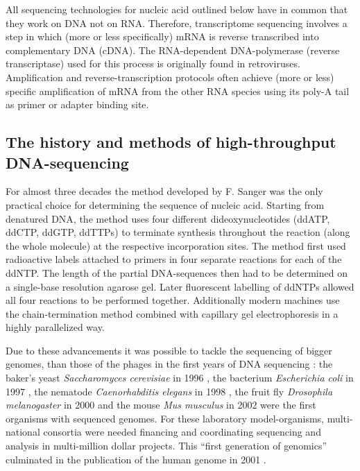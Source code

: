 All sequencing technologies for nucleic acid outlined below have in
common that they work on DNA not on RNA. Therefore, transcriptome
sequencing involves a step in which (more or less specifically) mRNA
is reverse transcribed into complementary DNA (cDNA). The
RNA-dependent DNA-polymerase (reverse transcriptase) used for this
process is originally found in retroviruses. Amplification and
reverse-transcription protocols often achieve (more or less) specific
amplification of mRNA from the other RNA species using its poly-A tail
as primer or adapter binding site.

\subsection{The history and methods of high-throughput DNA-sequencing}
\label{his-seq}

For almost three decades the method developed by F. Sanger
\cite{pmid271968} was the only practical choice for determining the
sequence of nucleic acid. Starting from denatured DNA, the method uses
four different dideoxynucleotides (ddATP, ddCTP, ddGTP, ddTTPs) to
terminate synthesis throughout the reaction (along the whole molecule)
at the respective incorporation sites. The method first used
radioactive labels attached to primers in four separate reactions for
each of the ddNTP. The length of the partial DNA-sequences then had to
be determined on a single-base resolution agarose gel. Later
fluorescent labelling of ddNTPs allowed all four reactions to be
performed together. Additionally modern machines use the
chain-termination method combined with capillary gel electrophoresis
\cite{pmid2326186} in a highly parallelized way.

Due to these advancements it was possible to tackle the sequencing of
bigger genomes, than those of the phages in the first years of DNA
sequencing \cite{pmid1264203}: the baker's yeast \textit{Saccharomyces
  cerevisiae} in 1996 \cite{pmid8849441}, the bacterium
\textit{Escherichia coli} in 1997 \cite{pmid9278503}, the nematode
\textit{Caenorhabditis elegans} in 1998 \cite{pmid9851916}, the fruit
fly \textit{Drosophila melanogaster} in 2000 \cite{adams2000genome}
and the mouse \textit{Mus musculus} in 2002 \cite{pmid12466850} were
the first organisms with sequenced genomes. For these laboratory
model-organisms, multi-national consortia were needed financing and
coordinating sequencing and analysis in multi-million dollar
projects. This ``first generation of genomics'' culminated in the
publication of the human genome in 2001 \cite{pmid11181995}.

